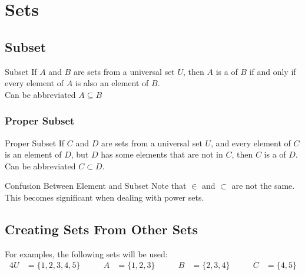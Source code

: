 \documentclass[../notes.tex]{subfiles}
\begin{document}
	\ifSubfilesClassLoaded{\setcounter{chapter}{2}}{}
	\chapter{Sets}
		\section{Subset}
			\begin{definition}{Subset}
				If $A$ and $B$ are sets from a universal set $U$, then $A$ is a  of $B$ if and only if every element of $A$ is also an element of $B$.\\
				Can be abbreviated $A \subseteq B$
			\end{definition}
			\subsection{Proper Subset}
				\begin{definition}{Proper Subset}
					If $C$ and $D$ are sets from a universal set $U$, and every element of $C$ is an element of $D$, but $D$ has some elements that are not in $C$, then $C$ is a  of $D$.\\
					Can be abbreviated $C \subset D$.
				\end{definition}
				\begin{sidenote}{Confusion Between Element and Subset}
					Note that $\in$ and $\subset$ are not the same. This becomes significant when dealing with power sets.
				\end{sidenote}
		\pagebreak
		\section{Creating Sets From Other Sets}
			For examples, the following sets will be used:
			\begin{alignat*}{4}
				U &= \{1, 2, 3, 4, 5\}\qquad & A &= \{1, 2, 3\} \qquad & B &= \{2, 3, 4\} \qquad & C &= \{4, 5\}
			\end{alignat*}
\end{document}
